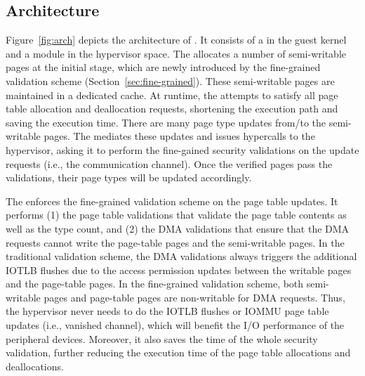 \subsection{\name Architecture}
Figure~\ref{fig:arch} depicts the architecture of \name. It consists of a \cache in the guest kernel and a \name module in the hypervisor space.
The \cache allocates a number of semi-writable pages at the initial stage,  which are newly introduced by the fine-grained validation scheme (Section~\ref{sec:fine-grained}).
These semi-writable pages are maintained in a dedicated cache.
At runtime, the \cache attempts to satisfy all page table allocation and deallocation requests, shortening the execution path and saving the execution time.
There are many page type updates from/to the semi-writable pages.
The \cache mediates these updates and issues hypercalls to the hypervisor, asking it to perform the fine-gained security validations on the update requests (i.e., the communication channel).
Once the verified pages pass the validations, their page types will be updated accordingly.

The \module enforces the fine-grained validation scheme on the page table updates.
It performs (1) the page table validations that validate the page table contents as well as the type count, and (2) the DMA validations that ensure that the DMA requests cannot write the page-table pages and the semi-writable pages.
In the traditional validation scheme, the DMA validations always triggers the additional IOTLB flushes due to the access permission updates between the writable pages and the page-table pages.
In the fine-grained validation scheme, both semi-writable pages and page-table pages are non-writable for DMA requests.
Thus, the hypervisor never needs to do the IOTLB flushes or IOMMU page table updates (i.e., vanished channel), which will benefit the I/O performance of the peripheral devices.
Moreover, it also saves the time of the whole security validation, further reducing the execution time of the page table allocations and deallocations.

